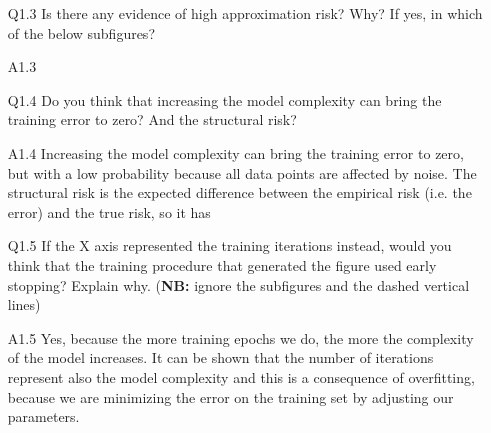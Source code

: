 \documentclass[11pt]{scrartcl}
\begin{document}
\begin{itemize}
\item[Q1.3] Is there any evidence of high approximation risk? Why? If yes, in which of the below subfigures?  
\item[A1.3] 

\item[Q1.4] Do you think that increasing the model complexity can bring the training error to zero? And the structural risk?  
\item[A1.4] Increasing the model complexity can bring the training error to zero, but with a low probability because all data points are affected by noise. The structural risk is the expected difference between the empirical risk (i.e. the error) and the true risk, so it has 

\item[Q1.5] If the X axis represented the training iterations instead, would you think that the training procedure that generated the figure used early stopping? Explain why. (\textbf{NB:} ignore the subfigures and the dashed vertical lines)
\item[A1.5] Yes, because the more training epochs we do, the more the complexity of the model increases. It can be shown that the number of iterations represent also the model complexity and this is a consequence of overfitting, because we are minimizing the error on the training set by adjusting our parameters.

\end{itemize}
\end{document}
